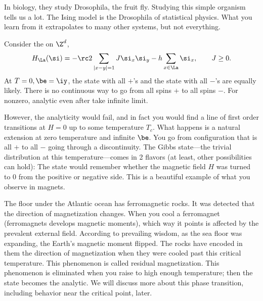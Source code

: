 In biology, they study Drosophila, the fruit fly. Studying this simple organism tells us a lot.
The Ising model is the Drosophila of statistical physics. What you learn from it extrapolates to many other systems, but not everything.


Consider the  on $\Z^d$,
\[
H_\La(\si) = -\rc 2\sum_{|x-y|=1} J \si_x\si_y - h\sum_{x\in \La} \si_x, \qquad J\ge 0.
\]
At $T=0,\be=\iy$, the state with all $+$'s and the state with all $-$'s are equally likely.
There is no continuous way to go from all spins $+$ to all spins $-$.
For nonzero, analytic even after take infinite limit.


However, the analyticity would fail, and in fact you would find a line of first order transitions at $H=0$ up to some temperature $T_c$. 
What happens is a natural extension at zero temperature and infinite $\be$. You go from configuration that is all $+$ to all $-$ going through a discontinuity. 
The Gibbs state---the trivial distribution at this temperature---comes in 2 flavors (at least, other possibilities can hold): The state would remember whether the magnetic field $H$ was turned to 0 from the positive or negative side. This is a beautiful example of what you observe in magnets. 

The floor under the Atlantic ocean has ferromagnetic rocks. It was detected that the direction of magnetization changes. When you cool a ferromagnet (ferromagnets develops magnetic moments), which way it points is affected by the prevalent external field. According to prevailing wisdom, as the sea floor was expanding, the Earth's magnetic moment flipped. The rocks have encoded in them the direction of magnetization when they were cooled past this critical temperature. This phenomenon is called residual magnetization.
This phenomenon is eliminated when you raise to high enough temperature; then the state becomes the analytic. 
We will discuss more about this phase transition, including behavior near the critical point, later.

